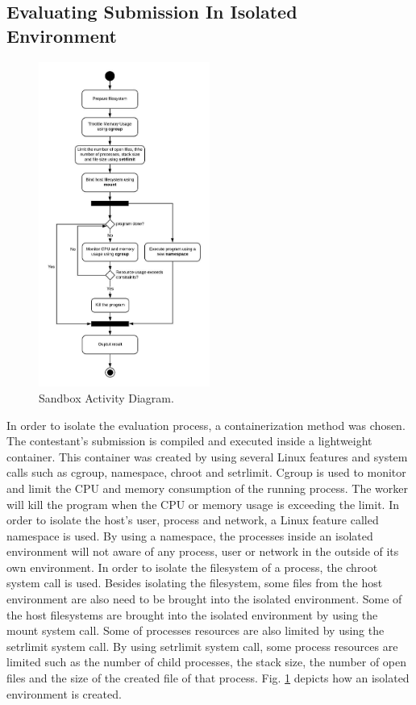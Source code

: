 \documentclass[conference,a4paper]{IEEEtran}
\begin{document}
\subsection{Evaluating Submission In Isolated Environment}

\begin{figure}[htbp]
\centerline{\includegraphics[width=0.5\textwidth]{images/paper-sandbox-activity.jpeg}}
\caption{Sandbox Activity Diagram.}
\label{paper-sandbox-activity}
\end{figure}

In order to isolate the evaluation process, a containerization method was chosen. The contestant's submission is compiled and executed inside a lightweight container. This container was created by using several Linux features and system calls such as cgroup, namespace, chroot and setrlimit. Cgroup is used to monitor and limit the CPU and memory consumption of the running process. The worker will kill the program when the CPU or memory usage is exceeding the limit. In order to isolate the host's user, process and network, a Linux feature called namespace is used. By using a namespace, the processes inside an isolated environment will not aware of any process, user or network in the outside of its own environment. In order to isolate the filesystem of a process, the chroot system call is used. Besides isolating the filesystem, some files from the host environment are also need to be brought into the isolated environment. Some of the host filesystems are brought into the isolated environment by using the mount system call. Some of processes resources are also limited by using the setrlimit system call. By using setrlimit system call, some process resources are limited such as the number of child processes, the stack size, the number of open files and the size of the created file of that process. Fig. \ref{paper-sandbox-activity} depicts how an isolated environment is created.
\end{document}
